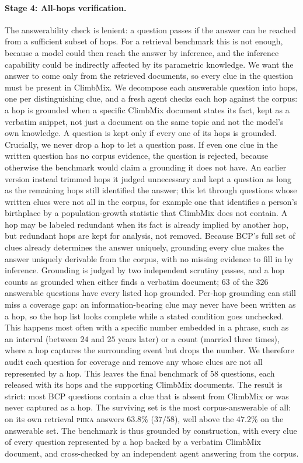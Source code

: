 \paragraph{Stage 4: All-hops verification.}
The answerability check is lenient: a question passes if the answer can be reached from a sufficient subset of
hops. For a retrieval benchmark this is not enough, because a model could then reach the answer by inference,
and the inference capability could be indirectly affected by its parametric knowledge. We want the answer to
come only from the retrieved documents, so every clue in the question must be present in ClimbMix. We
decompose each answerable question into hops, one per distinguishing clue, and a fresh agent checks each hop
against the corpus: a hop is grounded when a specific ClimbMix document states its fact, kept as a verbatim
snippet, not just a document on the same topic and not the model's own knowledge. A question is kept only if
every one of its hops is grounded. Crucially, we never drop a hop to let a question pass. If even one clue in
the written question has no corpus evidence, the question is rejected, because otherwise the benchmark would
claim a grounding it does not have. An earlier version instead trimmed hops it judged unnecessary and kept a
question as long as the remaining hops still identified the answer; this let through questions whose written
clues were not all in the corpus, for example one that identifies a person's birthplace by a population-growth
statistic that ClimbMix does not contain. A hop may be labeled redundant when its fact is already implied by
another hop, but redundant hops are kept for analysis, not removed. Because BCP's full set of clues already
determines the answer uniquely, grounding every clue makes the answer uniquely derivable from the corpus, with
no missing evidence to fill in by inference. Grounding is judged by two independent scrutiny passes, and a hop
counts as grounded when either finds a verbatim document; $63$ of the $326$ answerable questions have every
listed hop grounded. Per-hop grounding can still miss a coverage gap: an
information-bearing clue may never have been written as a hop, so the hop list looks complete while a stated
condition goes unchecked. This happens most often with a specific number embedded in a phrase, such as an
interval (between $24$ and $25$ years later) or a count (married three times), where a hop captures the
surrounding event but drops the number. We therefore audit each question for coverage and remove any whose
clues are not all represented by a hop. This leaves the final benchmark of $58$ questions, each released with
its hops and the supporting ClimbMix documents. The result is strict: most BCP questions contain a clue that is
absent from ClimbMix or was never captured as a hop. The surviving set is the most corpus-answerable of all: on
its own retrieval \textsc{piika} answers $63.8\%$ ($37/58$), well above the $47.2\%$ on the answerable set. The
benchmark is thus grounded by construction, with every clue of every question represented by a hop backed by a
verbatim ClimbMix document, and cross-checked by an independent agent answering from the corpus.

